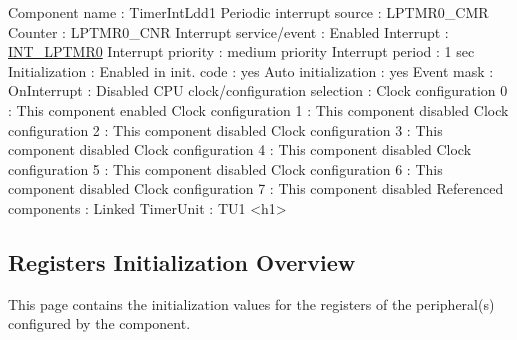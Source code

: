 \begin{DoxyCode}
            Component name                                 : TimerIntLdd1
            Periodic interrupt source                      : LPTMR0\_CMR
            Counter                                        : LPTMR0\_CNR
            Interrupt service/event                        : Enabled
              Interrupt                                    : \hyperlink{group___interrupt__vector__numbers_gga5f3656e2a154b64aa378a2f3856c3a8dadb33151c23fc4df6fa87f60d1df02dae}{INT\_LPTMR0}
              Interrupt priority                           : medium priority
            Interrupt period                               : 1 sec
            Initialization                                 : 
              Enabled in init. code                        : yes
              Auto initialization                          : yes
              Event mask                                   : 
                OnInterrupt                                : Disabled
            CPU clock/configuration selection              : 
              Clock configuration 0                        : This component enabled
              Clock configuration 1                        : This component disabled
              Clock configuration 2                        : This component disabled
              Clock configuration 3                        : This component disabled
              Clock configuration 4                        : This component disabled
              Clock configuration 5                        : This component disabled
              Clock configuration 6                        : This component disabled
              Clock configuration 7                        : This component disabled
            Referenced components                          : 
              Linked TimerUnit                             : TU1
<h1>
\end{DoxyCode}
 \hypertarget{TimerIntLdd1_regs_overview}{}\subsection{Registers Initialization Overview}\label{TimerIntLdd1_regs_overview}
This page contains the initialization values for the registers of the peripheral(s) configured by the component. \tabulinesep=1mm

